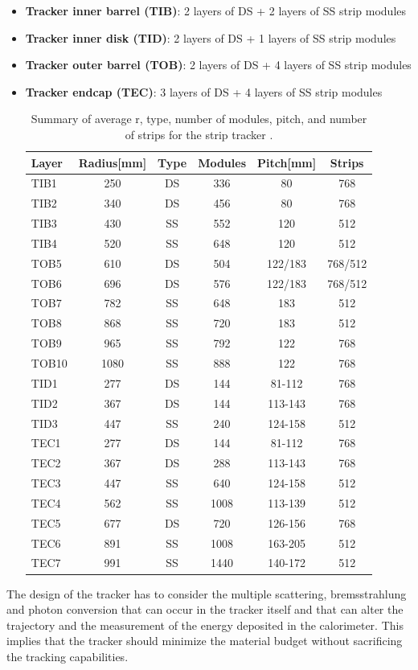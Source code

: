 \begin{itemize}

    \item \textbf{Tracker inner barrel (TIB)}: 2 layers of DS + 2 layers of SS strip modules 
    \item \textbf{Tracker inner disk (TID)}: 2 layers of DS + 1 layers of SS strip modules 
    \item \textbf{Tracker outer barrel (TOB)}: 2 layers of DS + 4 layers of SS strip modules 
    \item \textbf{Tracker endcap (TEC)}: 3 layers of DS + 4 layers of SS strip modules 
    \begin{table}[h!]
        \centering
        \begin{tabular}{l|c|c|c|c|c}
            Layer&Radius[mm]&Type&Modules&Pitch[mm]&Strips\\
            \hline
            TIB1&250&DS&336&80&768\\
            TIB2& 340& DS& 456& 80& 768\\
            TIB3&430&SS&552&120&512\\
            TIB4&520&SS&648&120&512\\
            TOB5&610&DS&504&122/183&768/512\\
            TOB6&696&DS&576&122/183&768/512\\
            TOB7&782&SS&648&183&512\\
            TOB8&868&SS&720&183&512\\
            TOB9&965&SS&792&122&768\\
            TOB10&1080&SS&888&122&768\\
            TID1&277&DS&144&81-112&768\\
            TID2&367&DS&144&113-143&768\\
            TID3&447&SS&240&124-158&512\\
            TEC1&277&DS&144&81-112&768\\
            TEC2&367&DS&288&113-143&768\\
            TEC3&447&SS&640&124-158&512\\
            TEC4&562&SS&1008&113-139&512\\
            TEC5&677&DS&720&126-156&768\\
            TEC6&891&SS&1008&163-205&512\\
            TEC7&991&SS&1440&140-172&512\\
        \end{tabular}
        \caption{Summary of average r, type, number of modules, pitch, and number of strips for the strip tracker \cite{Friedl2001TheReadout}.}
        \label{tab:strip_tracker}
    \end{table}
\end{itemize}
The design of the tracker has to consider the multiple scattering, bremsstrahlung and photon conversion that can occur in the tracker itself and that can alter the trajectory and the measurement of the energy deposited in the calorimeter. This implies that the tracker should minimize the material budget without sacrificing the tracking capabilities.

